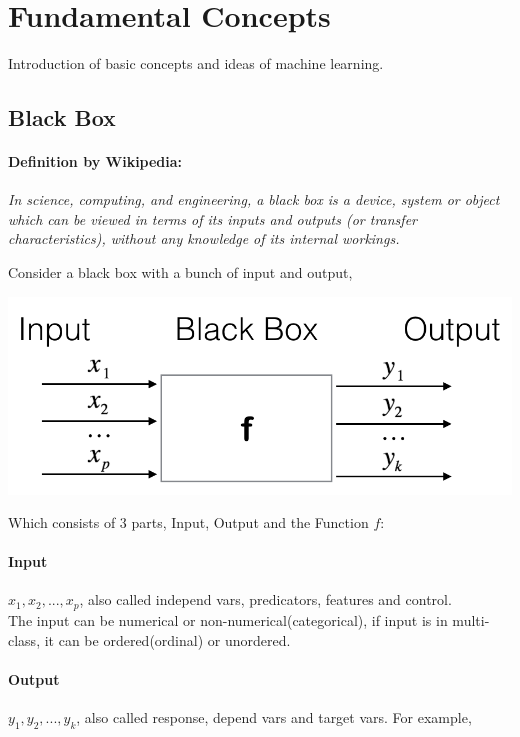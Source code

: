 \documentclass{article}
\begin{document}
\section{Fundamental Concepts}{
    Introduction of basic concepts and ideas of machine learning.
    \subsection{Black Box}{
        \paragraph{Definition by Wikipedia:}{
            \textit{In science, computing, and engineering, a black box is a device, system or object which can be viewed in terms of its inputs and outputs (or transfer characteristics), without any knowledge of its internal workings.}\\
        }
        
        Consider a black box with a bunch of input and output,

        \begin{center}{
            \includegraphics[scale=0.5]{blackbox.png}
        }
        \end{center}

        Which consists of 3 parts, Input, Output and the Function $f$:
        
        \paragraph{Input}{
            $x_1,x_2,...,x_p$, also called independ vars, predicators, features and control.\\
            The input can be numerical or non-numerical(categorical), if input is in multi-class, it can be ordered(ordinal) or unordered.
        }

        \paragraph{Output}{
            $y_1,y_2,...,y_k$, also called response, depend vars and target vars. For example,

}}}
\end{document}
